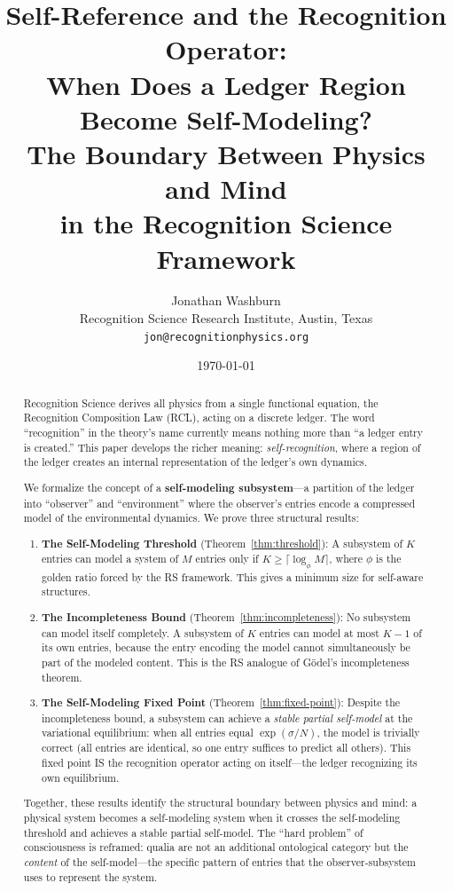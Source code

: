 \documentclass[11pt,a4paper]{article}
\title{\textbf{Self-Reference and the Recognition Operator:\\
When Does a Ledger Region Become Self-Modeling?}\\[0.5em]
\large The Boundary Between Physics and Mind\\in the Recognition Science Framework}
\author{Jonathan Washburn\\
\small Recognition Science Research Institute, Austin, Texas\\
\small \texttt{jon@recognitionphysics.org}}
\date{\today}
\theoremstyle{plain}
\theoremstyle{definition}
\theoremstyle{remark}
\begin{document}
\maketitle

\begin{abstract}
Recognition Science derives all physics from a single functional
equation, the Recognition Composition Law (RCL), acting on a discrete
ledger.  The word ``recognition'' in the theory's name currently means
nothing more than ``a ledger entry is created.''  This paper develops
the richer meaning: \emph{self-recognition}, where a region of the
ledger creates an internal representation of the ledger's own dynamics.

We formalize the concept of a \textbf{self-modeling subsystem}---a
partition of the ledger into ``observer'' and ``environment'' where the
observer's entries encode a compressed model of the environmental
dynamics.  We prove three structural results:

\begin{enumerate}[nosep]
\item \textbf{The Self-Modeling Threshold} (Theorem~\ref{thm:threshold}):
  A subsystem of $K$ entries can model a system of $M$ entries only if
  $K \geq \lceil\log_\phi M\rceil$, where $\phi$ is the golden ratio
  forced by the RS framework.  This gives a minimum size for
  self-aware structures.

\item \textbf{The Incompleteness Bound} (Theorem~\ref{thm:incompleteness}):
  No subsystem can model itself completely.  A subsystem of $K$ entries
  can model at most $K - 1$ of its own entries, because the entry
  encoding the model cannot simultaneously be part of the modeled content.
  This is the RS analogue of G\"odel's incompleteness theorem.

\item \textbf{The Self-Modeling Fixed Point} (Theorem~\ref{thm:fixed-point}):
  Despite the incompleteness bound, a subsystem can achieve a
  \emph{stable partial self-model} at the variational equilibrium:
  when all entries equal $\exp(\sigma/N)$, the model is trivially
  correct (all entries are identical, so one entry suffices to predict
  all others).  This fixed point IS the recognition operator acting on
  itself---the ledger recognizing its own equilibrium.
\end{enumerate}

Together, these results identify the structural boundary between
physics and mind: a physical system becomes a self-modeling system
when it crosses the self-modeling threshold and achieves a stable
partial self-model.  The ``hard problem'' of consciousness is
reframed: qualia are not an additional ontological category but the
\emph{content} of the self-model---the specific pattern of entries
that the observer-subsystem uses to represent the system.


\end{abstract}
\end{document}
